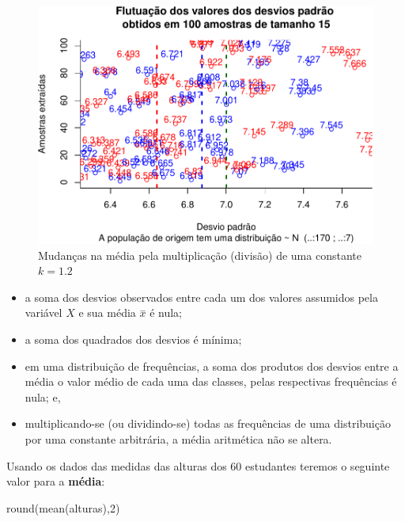\documentclass[
]{book}
\newenvironment{Shaded}{\begin{snugshade}}{\end{snugshade}}
\newcommand{\DecValTok}[1]{\textcolor[rgb]{0.00,0.00,0.81}{#1}}
\newcommand{\FunctionTok}[1]{\textcolor[rgb]{0.00,0.00,0.00}{#1}}
\newcommand{\NormalTok}[1]{#1}
\providecommand{\tightlist}{%
  \setlength{\itemsep}{0pt}\setlength{\parskip}{0pt}}
\begin{document}
\begin{figure}

{\centering \includegraphics{apostila_files/figure-latex/unnamed-chunk-35-1} 

}

\caption{Mudanças na média pela multiplicação (divisão) de uma constante $k=1.2$}\label{fig:unnamed-chunk-35}
\end{figure}

\begin{itemize}
\tightlist
\item
  a soma dos desvios observados entre cada um dos valores assumidos pela variável \(X\) e sua média \(\stackrel{-}{x}\) é nula;
\item
  a soma dos quadrados dos desvios é mínima;
\item
  em uma distribuição de frequências, a soma dos produtos dos desvios entre a média o valor médio de cada uma das classes, pelas respectivas frequências é nula; e,
\item
  multiplicando-se (ou dividindo-se) todas as frequências de uma distribuição por uma constante arbitrária, a média aritmética não se altera.
\end{itemize}

Usando os dados das medidas das alturas dos 60 estudantes teremos o seguinte valor para a \textbf{média}:

\begin{Shaded}
\begin{Highlighting}[]
\FunctionTok{round}\NormalTok{(}\FunctionTok{mean}\NormalTok{(alturas),}\DecValTok{2}\NormalTok{)}
\end{Highlighting}
\end{Shaded}
\end{document}
